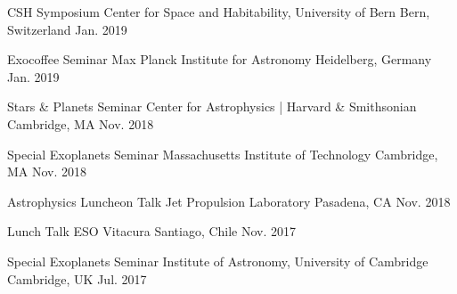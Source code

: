

\begin{talks}

  \talk
    {CSH Symposium} %
    {Center for Space and Habitability, University of Bern} %
    {Bern, Switzerland} %
    {Jan. 2019} %
    
  \talk
    {Exocoffee Seminar} %
    {Max Planck Institute for Astronomy} %
    {Heidelberg, Germany} %
    {Jan. 2019} %
    
  \talk
    {Stars \& Planets Seminar} %
    {Center for Astrophysics | Harvard \& Smithsonian} %
    {Cambridge, MA} %
    {Nov. 2018} %
    
  \talk
    {Special Exoplanets Seminar} %
    {Massachusetts Institute of Technology} %
    {Cambridge, MA} %
    {Nov. 2018} %

  \talk
    {Astrophysics Luncheon Talk} %
    {Jet Propulsion Laboratory} %
    {Pasadena, CA} %
    {Nov. 2018} %

  \talk
    {Lunch Talk} %
    {ESO Vitacura} %
    {Santiago, Chile} %
    {Nov. 2017} %

  \talk
    {Special Exoplanets Seminar} %
    {Institute of Astronomy, University of Cambridge} %
    {Cambridge, UK} %
    {Jul. 2017} %


\end{talks}